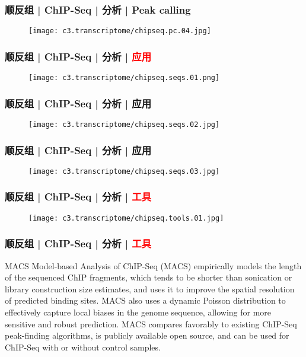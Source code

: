 \begin{frame}
  \frametitle{顺反组 | ChIP-Seq | 分析 | Peak calling}
  \begin{figure}
    \centering
    \texttt{[image: c3.transcriptome/chipseq.pc.04.jpg]}
  \end{figure}
\end{frame}

\begin{frame}
  \frametitle{顺反组 | ChIP-Seq | 分析 | \textcolor{red}{应用}}
  \begin{figure}
    \centering
    \texttt{[image: c3.transcriptome/chipseq.seqs.01.png]}
  \end{figure}
\end{frame}

\begin{frame}
  \frametitle{顺反组 | ChIP-Seq | 分析 | 应用}
  \begin{figure}
    \centering
    \texttt{[image: c3.transcriptome/chipseq.seqs.02.jpg]}
  \end{figure}
\end{frame}

\begin{frame}
  \frametitle{顺反组 | ChIP-Seq | 分析 | 应用}
  \begin{figure}
    \centering
    \texttt{[image: c3.transcriptome/chipseq.seqs.03.jpg]}
  \end{figure}
\end{frame}

\begin{frame}
  \frametitle{顺反组 | ChIP-Seq | 分析 | \textcolor{red}{工具}}
  \begin{figure}
    \centering
    \texttt{[image: c3.transcriptome/chipseq.tools.01.jpg]}
  \end{figure}
\end{frame}

\begin{frame}
  \frametitle{顺反组 | ChIP-Seq | 分析 | \textcolor{red}{工具}}
  \begin{block}{MACS}
    Model-based Analysis of ChIP-Seq (MACS) empirically models the length of the sequenced ChIP fragments, which tends to be shorter than sonication or library construction size estimates, and uses it to improve the spatial resolution of predicted binding sites. MACS also uses a dynamic Poisson distribution to effectively capture local biases in the genome sequence, allowing for more sensitive and robust prediction. MACS compares favorably to existing ChIP-Seq peak-finding algorithms, is publicly available open source, and can be used for ChIP-Seq with or without control samples.
  \end{block}
\end{frame}

